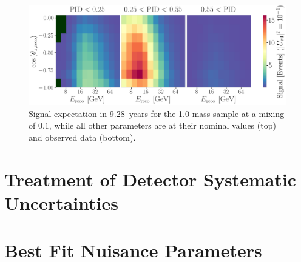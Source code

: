 \begin{figure}[h]
    \includegraphics{figures/results/3d_histograms/signal_1.0_GeV_combined_U_tau4_sq_0.1000_total.png}
    \caption[Three dimensional signal expectation]{Signal expectation in \SI{9.28}{years} for the \SI{1.0}{\gev} mass sample at a mixing of $0.1$, while all other parameters are at their nominal values (top) and observed data (bottom).}
\end{figure}


\section{Treatment of Detector Systematic Uncertainties} 


\section{Best Fit Nuisance Parameters}

